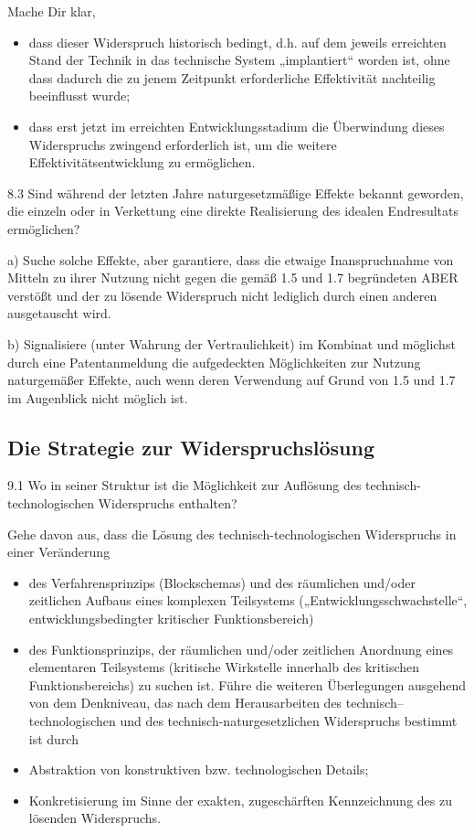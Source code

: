 \documentclass[12pt,a4paper]{article}
\begin{document}
Mache Dir klar,
\begin{itemize}
\item dass dieser Widerspruch historisch bedingt, d.h. auf dem jeweils
  erreichten Stand der Technik in das technische System „implantiert“ worden
  ist, ohne dass dadurch die zu jenem Zeitpunkt erforderliche Effektivität
  nachteilig beeinflusst wurde; 
\item dass erst jetzt im erreichten Entwicklungsstadium die Überwindung dieses
  Widerspruchs zwingend erforderlich ist, um die weitere
  Effektivitätsentwicklung zu ermöglichen.
\end{itemize}

8.3 Sind während der letzten Jahre naturgesetzmäßige Effekte bekannt geworden,
die einzeln oder in Verkettung eine direkte Realisierung des idealen
Endresultats ermöglichen?

a) Suche solche Effekte, aber garantiere, dass die etwaige Inanspruchnahme von
Mitteln zu ihrer Nutzung nicht gegen die gemäß 1.5 und 1.7 begründeten ABER
verstößt und der zu lösende Widerspruch nicht lediglich durch einen anderen
ausgetauscht wird.

b) Signalisiere (unter Wahrung der Vertraulichkeit) im Kombinat und möglichst
durch eine Patentanmeldung die aufgedeckten Möglichkeiten zur Nutzung
naturgemäßer Effekte, auch wenn deren Verwendung auf Grund von 1.5 und 1.7 im
Augenblick nicht möglich ist.

\subsection{Die Strategie zur Widerspruchslösung}

9.1 Wo in seiner Struktur ist die Möglichkeit zur Auflösung des
technisch-technologischen Widerspruchs enthalten?

Gehe davon aus, dass die Lösung des technisch-technologischen Widerspruchs in
einer Veränderung
\begin{itemize}
  \item des Verfahrensprinzips (Blockschemas) und des räumlichen und/oder
    zeitlichen Aufbaus eines komplexen Teilsystems
    („Entwicklungsschwachstelle“, entwicklungsbedingter kritischer
    Funktionsbereich)
  \item des Funktionsprinzips, der räumlichen und/oder zeitlichen Anordnung
    eines elementaren Teilsystems (kritische Wirkstelle innerhalb des
    kritischen Funktionsbereichs) zu suchen ist. Führe die weiteren
    Überlegungen ausgehend von dem Denkniveau, das nach dem Herausarbeiten des
    technisch–technologischen und des technisch-naturgesetzlichen Widerspruchs
    bestimmt ist durch
  \item Abstraktion von konstruktiven bzw. technologischen Details;
  \item Konkretisierung im Sinne der exakten, zugeschärften Kennzeichnung des
    zu lösenden Widerspruchs.
\end{itemize}
\end{document}
